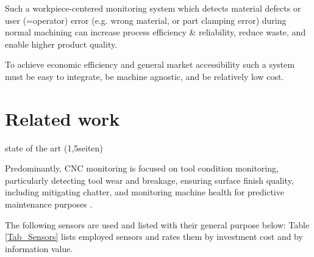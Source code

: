 \documentclass[5p,times,procedia]{elsarticle}
\newenvironment{note}{%
	\noindent
    \color{notecolor}%
}{%
    \par\medskip%
}
\begin{document}
Such a workpiece-centered monitoring system which detects material defects or user (=operator) error (e.g. wrong material, or part clamping error) during normal machining can increase process efficiency \& reliability, reduce waste, and enable higher product quality.  

To achieve economic efficiency and general market accessibility such a system must be easy to integrate, be machine agnostic, and be relatively low cost.

 
\section{Related work}
\begin{note}
	state of the art (1,5seiten)

\end{note}



Predominantly, CNC monitoring is focused on tool condition monitoring, particularly detecting tool wear and breakage, ensuring surface finish quality, including mitigating chatter, and monitoring machine health for predictive maintenance purposes \cite[p.2727]{Kuntoglu.Salur.ea2021}.

The following sensors are used and listed with their general purpose below:
Table \ref{Tab_Sensors} lists employed sensors and rates them by investment cost and by information value.
\end{document}
